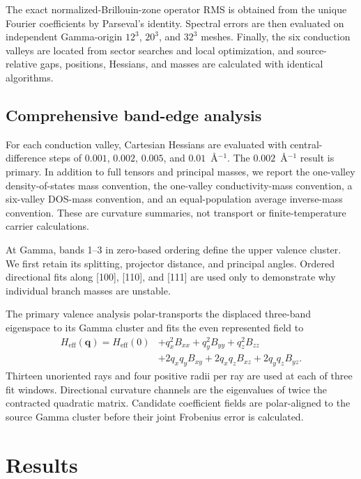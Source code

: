 \documentclass[11pt]{article}
\newcommand{\qvec}{\mathbf{q}}
\begin{document}
The exact normalized-Brillouin-zone operator RMS is obtained from the unique Fourier
coefficients by Parseval's identity.  Spectral errors are then evaluated on independent
Gamma-origin \(12^3\), \(20^3\), and \(32^3\) meshes.  Finally, the six conduction
valleys are located from sector searches and local optimization, and source-relative
gaps, positions, Hessians, and masses are calculated with identical algorithms.

\subsection{Comprehensive band-edge analysis}

For each conduction valley, Cartesian Hessians are evaluated with central-difference
steps of \(0.001\), \(0.002\), \(0.005\), and \(0.01\)~\AA$^{-1}$.  The
\(0.002\)~\AA$^{-1}$ result is primary.  In addition to full tensors and principal
masses, we report the one-valley density-of-states mass convention, the one-valley
conductivity-mass convention, a six-valley DOS-mass convention, and an equal-population
average inverse-mass convention.  These are curvature summaries, not transport or
finite-temperature carrier calculations.

At Gamma, bands 1--3 in zero-based ordering define the upper valence cluster.  We first
retain its splitting, projector distance, and principal angles.  Ordered directional
fits along [100], [110], and [111] are used only to demonstrate why individual branch
masses are unstable.

The primary valence analysis polar-transports the displaced three-band eigenspace to its
Gamma cluster and fits the even represented field to
\begin{align}
  H_{\mathrm{eff}}(\qvec)=H_{\mathrm{eff}}(0)
  &+q_x^2B_{xx}+q_y^2B_{yy}+q_z^2B_{zz} \\
  &+2q_xq_yB_{xy}+2q_xq_zB_{xz}+2q_yq_zB_{yz}.
  \label{eq:valence}
\end{align}
Thirteen unoriented rays and four positive radii per ray are used at each of three fit
windows.  Directional curvature channels are the eigenvalues of twice the contracted
quadratic matrix.  Candidate coefficient fields are polar-aligned to the source Gamma
cluster before their joint Frobenius error is calculated.

\section{Results}
\end{document}
